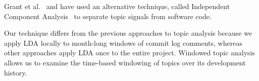 \documentclass[times, 10pt,twocolumn]{article}
\begin{document}
Grant et al.~\cite{scottcordy} and have used an alternative technique,
called Independent Component Analysis~\cite{delac-short} to separate topic signals from
software code.

Our technique differs from the previous approaches to topic analysis because we apply
LDA locally to month-long windows of commit log comments, whereas
other approaches apply LDA once to the entire project. Windowed topic
analysis allows us to examine the time-based windowing of topics over
its development history.


\end{document}
